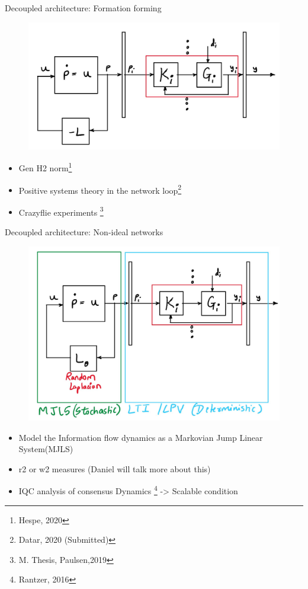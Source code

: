 \begin{frame}{Decoupled architecture: Formation forming}	
		\begin{figure}
		\includegraphics[scale=0.35]{figures/decoupled_consensus.JPG}	
		\label{fig:Coupled}
	\end{figure}
	\begin{itemize}
		\item Gen H2 norm\footnote{Hespe, 2020}
		\item Positive systems theory in the network loop\footnote{Datar, 2020 (Submitted)}
		\item Crazyflie experiments \footnote{M. Thesis, Paulsen,2019}
	\end{itemize}
\end{frame}
\begin{frame}{Decoupled architecture: Non-ideal networks}
	\begin{figure}
		\includegraphics[scale=0.35]{figures/decoupled_stoch_deterministic.JPG}	
		\label{fig:Coupled}
	\end{figure}
	\begin{itemize}
		\item Model the Information flow dynamics as a Markovian Jump Linear System(MJLS)
		\item r2 or w2 measures (Daniel will talk more about this)
		\item IQC analysis of consensus Dynamics \footnote{Rantzer, 2016} -> Scalable condition
	\end{itemize}
\end{frame}
